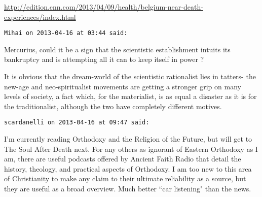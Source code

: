 \begin{footnotesize}
\begin{sffamily}
\url{http://edition.cnn.com/2013/04/09/health/belgium-near-death-experiences/index.html}


\hfill

\texttt{Mihai on 2013-04-16 at 03:44 said: }

Mercurius, could it be a sign that the scientistic establishment intuits its bankruptcy and is attempting all it can to keep itself in power ?

It is obvious that the dream-world of the scientistic rationalist lies in tatters- the new-age and neo-spiritualist movements are getting a stronger grip on many levels of society, a fact which, for the materialist, is as equal a disaster as it is for the traditionalist, although the two have completely different motives.


\hfill

\texttt{scardanelli on 2013-04-16 at 09:47 said: }

I'm currently reading Orthodoxy and the Religion of the Future, but will get to The Soul After Death next. For any others as ignorant of Eastern Orthodoxy as I am, there are useful podcasts offered by Ancient Faith Radio that detail the history, theology, and practical aspects of Orthodoxy. I am too new to this area of Christianity to make any claim to their ultimate reliability as a source, but they are useful as a broad overview. Much better ``car listening" than the news.


\hfill


\end{sffamily}\end{footnotesize}
